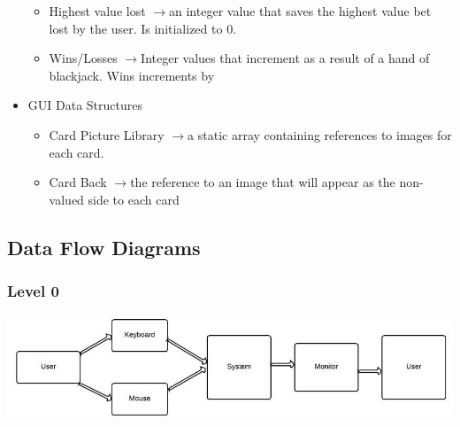 \documentclass{article}
\begin{document}
\begin{itemize}
\begin{itemize}
\item Highest value lost $\rightarrow$an integer value that saves the highest value bet lost by the user.  Is initialized to 0.
\item Wins/Losses $\rightarrow$Integer values that increment as a result of a hand of blackjack.  Wins increments by
\end{itemize}
\item GUI Data Structures
\begin{itemize}
\item Card Picture Library $\rightarrow$a static array containing references to images for each card.  
\item Card Back $\rightarrow$the reference to an image that will appear as the non-valued side to each card
\end{itemize}
\end{itemize}
\subsection{Data Flow Diagrams}

\subsubsection{Level 0}
\includegraphics[width=\textwidth]{Level0Diagram}
\end{document}
